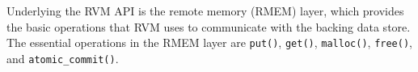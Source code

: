 Underlying the RVM API is the remote memory (RMEM) layer, which provides the
basic operations that RVM uses to communicate with the backing data store.
The essential operations in the RMEM layer are \texttt{put()}, \texttt{get()},
\texttt{malloc()}, \texttt{free()}, and \texttt{atomic\_commit()}.
